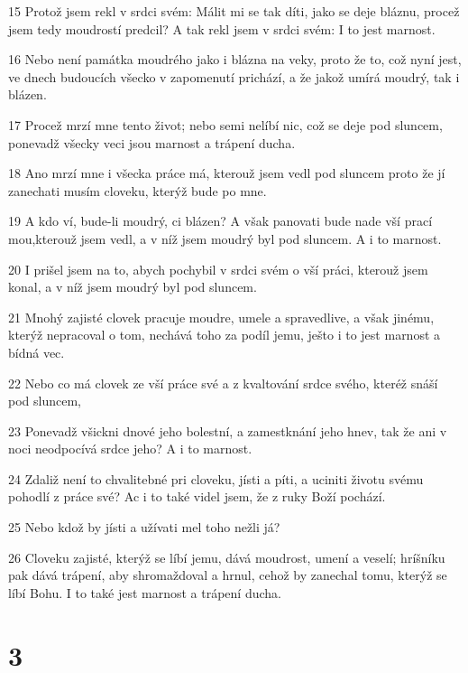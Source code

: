 \par 15 Protož jsem rekl v srdci svém: Málit mi se tak díti, jako se deje bláznu, procež jsem tedy moudrostí predcil? A tak rekl jsem v srdci svém: I to jest marnost.
\par 16 Nebo není památka moudrého jako i blázna na veky, proto že to, což nyní jest, ve dnech budoucích všecko v zapomenutí prichází, a že jakož umírá moudrý, tak i blázen.
\par 17 Procež mrzí mne tento život; nebo semi nelíbí nic, což se deje pod sluncem, ponevadž všecky veci jsou marnost a trápení ducha.
\par 18 Ano mrzí mne i všecka práce má, kterouž jsem vedl pod sluncem proto že jí zanechati musím cloveku, kterýž bude po mne.
\par 19 A kdo ví, bude-li moudrý, ci blázen? A však panovati bude nade vší prací mou,kterouž jsem vedl, a v níž jsem moudrý byl pod sluncem. A i to marnost.
\par 20 I prišel jsem na to, abych pochybil v srdci svém o vší práci, kterouž jsem konal, a v níž jsem moudrý byl pod sluncem.
\par 21 Mnohý zajisté clovek pracuje moudre, umele a spravedlive, a však jinému, kterýž nepracoval o tom, nechává toho za podíl jemu, ješto i to jest marnost a bídná vec.
\par 22 Nebo co má clovek ze vší práce své a z kvaltování srdce svého, kteréž snáší pod sluncem,
\par 23 Ponevadž všickni dnové jeho bolestní, a zamestknání jeho hnev, tak že ani v noci neodpocívá srdce jeho? A i to marnost.
\par 24 Zdaliž není to chvalitebné pri cloveku, jísti a píti, a uciniti životu svému pohodlí z práce své? Ac i to také videl jsem, že z ruky Boží pochází.
\par 25 Nebo kdož by jísti a užívati mel toho nežli já?
\par 26 Cloveku zajisté, kterýž se líbí jemu, dává moudrost, umení a veselí; hríšníku pak dává trápení, aby shromaždoval a hrnul, cehož by zanechal tomu, kterýž se líbí Bohu. I to také jest marnost a trápení ducha.

\chapter{3}


